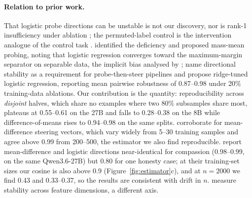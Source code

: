 \documentclass{article}
\begin{document}
\paragraph{Relation to prior work.} That logistic probe directions can be unstable is not our discovery, nor is rank-1 insufficiency under ablation \citep{elazar2021amnesic,ravfogel2020inlp,belrose2023leace}; the permuted-label control is the intervention analogue of the control task \citep{hewitt2019control}. \citet{marks2023geometry} identified the deficiency and proposed mass-mean probing, noting that logistic regression converges toward the maximum-margin separator on separable data, the implicit bias analysed by \citet{soudry2018implicit}; \citet{gao2026raptor} name directional stability as a requirement for probe-then-steer pipelines and propose ridge-tuned logistic regression, reporting mean pairwise robustness of 0.87--0.98 under 20\% training-data ablations. Our contribution is the quantity: reproducibility across \emph{disjoint} halves, which share no examples where two 80\% subsamples share most, plateaus at 0.55--0.61 on the 27B and falls to 0.28--0.38 on the 8B while difference-of-means rises to 0.94--0.98 on the same splits. \citet{braun2025unreliability} corroborate for mean-difference steering vectors, which vary widely from 5--30 training samples and agree above 0.99 from 200--500, the estimator we also find reproducible. \citet{herbster2026steering} report mean-difference and logistic directions near-identical for compassion (0.98--0.99, on the same Qwen3.6-27B) but 0.80 for one honesty case; at their training-set sizes our cosine is also above 0.9 (Figure~\ref{fig:estimator}c), and at $n=2000$ we find 0.43 and 0.33--0.37, so the results are consistent with drift in $n$. \citet{raju2026geometric} measure stability across feature dimensions, a different axis.
\end{document}
